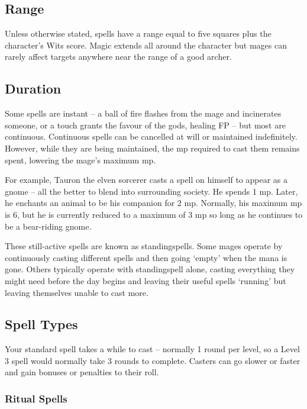 \begin{multicols}{2}
\subsection{Range}

Unless otherwise stated, spells have a range equal to five squares plus the character's Wits score. Magic extends all around the character but mages can rarely affect targets anywhere near the range of a good archer.

\subsection{Duration}

Some spells are instant -- a ball of fire flashes from the mage and incinerates someone, or a touch grants the favour of the gods, healing FP -- but most are continuous. Continuous spells can be cancelled at will or maintained indefinitely. However, while they are being maintained, the \gls{mp} required to cast them remains spent, lowering the mage's maximum \gls{mp}.

For example, Tauron the elven sorcerer casts a spell on himself to appear as a gnome -- all the better to blend into surrounding society. He spends 1 \gls{mp}. Later, he enchants an animal to be his companion for 2 \gls{mp}. Normally, his maximum \gls{mp} is 6, but he is currently reduced to a maximum of 3 \gls{mp} so long as he continues to be a bear-riding gnome.

These still-active spells are known as \glspl{standingspell}. Some mages operate by continuously casting different spells and then going `empty' when the mana is gone. Others typically operate with \gls{standingspell} alone, casting everything they might need before the day begins and leaving their useful spells `running' but leaving themselves unable to cast more.

\subsection{Spell Types}

Your standard spell takes a while to cast -- normally 1 \gls{round} per level, so a Level 3 spell would normally take 3 \glspl{round} to complete.  Casters can go slower or faster and gain bonuses or penalties to their roll.

\subsubsection{Ritual Spells}


\end{multicols}
